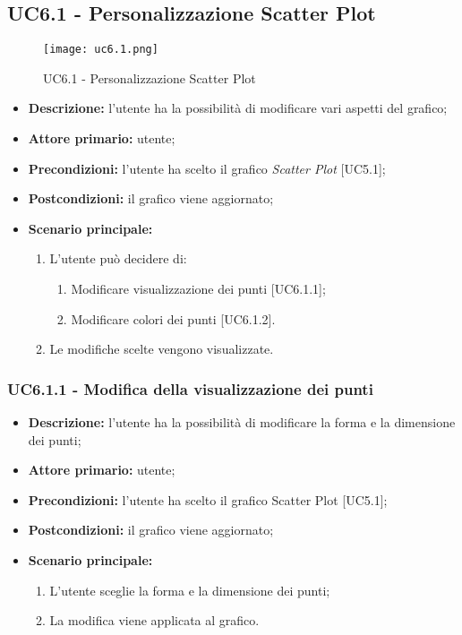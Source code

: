 \subsection{UC6.1 - Personalizzazione Scatter Plot}
\begin{figure}[H]
  \centering
  \texttt{[image: uc6.1.png]}
  \caption{UC6.1 - Personalizzazione Scatter Plot}
\end{figure}
\begin{itemize}
    \item \textbf{Descrizione:} l'utente ha la possibilità di modificare vari aspetti del grafico;
    \item \textbf{Attore primario:} utente;
    \item \textbf{Precondizioni:} l’utente ha scelto il grafico \textit{Scatter Plot} [UC5.1];
    \item \textbf{Postcondizioni:} il grafico viene aggiornato;
    \item \textbf{Scenario principale:}
    \begin{enumerate}
      \item L'utente può decidere di:
    \begin{enumerate}
      \item Modificare visualizzazione dei punti [UC6.1.1];
      \item Modificare colori dei punti  [UC6.1.2].
    \end{enumerate}
    \item Le modifiche scelte vengono visualizzate.
  \end{enumerate}
  \end{itemize}
  
    \subsubsection{UC6.1.1 - Modifica della visualizzazione dei punti}
  \begin{itemize}
    \item \textbf{Descrizione:} l'utente ha la possibilità di modificare la forma e la dimensione dei punti;
    \item \textbf{Attore primario:} utente;
    \item \textbf{Precondizioni:} l’utente ha scelto il grafico Scatter Plot [UC5.1];
    \item \textbf{Postcondizioni:} il grafico viene aggiornato;
    \item \textbf{Scenario principale:}
     \begin{enumerate}
      \item L'utente sceglie la forma e la dimensione dei punti;
      \item La modifica viene applicata al grafico.
    \end{enumerate}
  \end{itemize}
  
